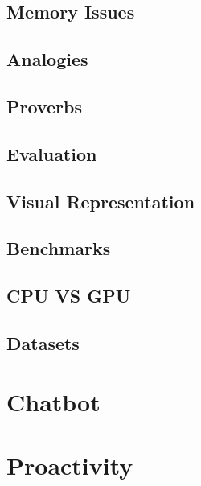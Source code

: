 \subsection{Memory Issues}
\subsection{Analogies}
\subsection{Proverbs}
\subsection{Evaluation}
\subsection{Visual Representation}
\subsection{Benchmarks}
\subsection{CPU VS GPU}
\subsection{Datasets}
\section{Chatbot}
\section{Proactivity}